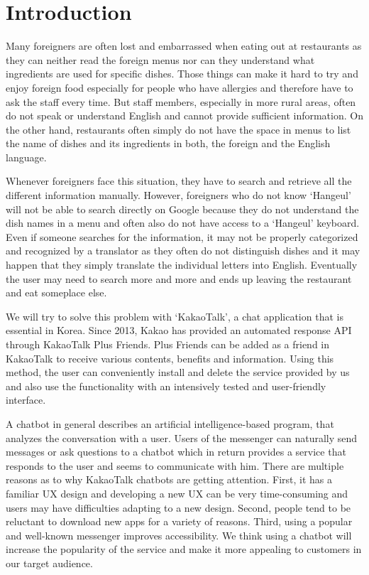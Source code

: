 \section{Introduction}
Many foreigners are often lost and embarrassed when eating out at restaurants as they can neither read the foreign menus nor can they understand what ingredients are used for specific dishes. Those things can make it hard to try and enjoy foreign food especially for people who have allergies and therefore have to ask the staff every time. But staff members, especially in more rural areas, often do not speak or understand English and cannot provide sufficient information. On the other hand, restaurants often simply do not have the space in menus to list the name of dishes and its ingredients in both, the foreign and the English language.

 Whenever foreigners face this situation, they have to search and retrieve all the different information manually. However, foreigners who do not know ‘Hangeul’ will not be able to search directly on Google because they do not understand the dish names in a menu and often also do not have access to a ‘Hangeul’ keyboard. Even if someone searches for the information, it may not be properly categorized and recognized by a translator as they often do not distinguish dishes and it may happen that they simply translate the individual letters into English. Eventually the user may need to search more and more and ends up leaving the restaurant and eat someplace else. 

 We will try to solve this problem with ‘KakaoTalk’, a chat application that is essential in Korea. Since 2013, Kakao has provided an automated response API through KakaoTalk Plus Friends. Plus Friends can be added as a friend in KakaoTalk to receive various contents, benefits and information. Using this method, the user can conveniently install and delete the service provided by us and also use the functionality with an intensively tested and user-friendly interface.

 A chatbot in general describes an artificial intelligence-based program, that analyzes the conversation with a user. Users of the messenger can naturally send messages or ask questions to a chatbot which in return provides a service that responds to the user and seems to communicate with him. There are multiple reasons as to why KakaoTalk chatbots are getting attention. First, it has a familiar UX design and developing a new UX can be very time-consuming and users may have difficulties adapting to a new design. Second, people tend to be reluctant to download new apps for a variety of reasons. Third, using a popular and well-known messenger improves accessibility. We think using a chatbot will increase the popularity of the service and make it more appealing to customers in our target audience. 

